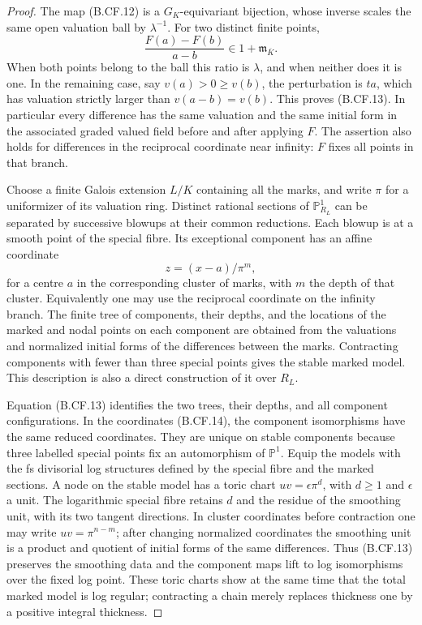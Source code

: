 \begin{proof}
The map (B.CF.12) is a \(G_K\)-equivariant bijection, whose inverse
scales the same open valuation ball by \(\lambda^{-1}\).
For two distinct finite points,
\[
          \frac{F(a)-F(b)}{a-b}\in1+\mathfrak m_{\overline K}.
                                                        \tag{B.CF.13}
\]
When both points belong to the ball this ratio is \(\lambda\), and
when neither does it is one. In the remaining case, say
\(v(a)>0\geq v(b)\), the perturbation is \(ta\), which has
valuation strictly larger than \(v(a-b)=v(b)\). This proves
(B.CF.13). In particular every difference has the same valuation and
the same initial form in the associated graded valued field before
and after applying \(F\). The assertion also holds for differences
in the reciprocal coordinate near infinity: \(F\) fixes all points
in that branch.

Choose a finite Galois extension \(L/K\) containing all the marks,
and write \(\pi\) for a uniformizer of its valuation ring. Distinct
rational sections of \(\mathbb P^1_{R_L}\) can be separated by
successive blowups at their common reductions. Each blowup is at a
smooth point of the special fibre. Its exceptional component has an
affine coordinate
\[
                          z=(x-a)/\pi^m,                 \tag{B.CF.14}
\]
for a centre \(a\) in the corresponding cluster of marks, with
\(m\) the depth of that cluster. Equivalently one may use the
reciprocal coordinate on the infinity branch. The finite tree of
components, their depths, and the locations of the marked and nodal
points on each component are obtained from the valuations and
normalized initial forms of the differences between the marks.
Contracting components with fewer than three special points gives
the stable marked model. This description is also a direct
construction of it over \(R_L\).

Equation (B.CF.13) identifies the two trees, their depths, and all
component configurations. In the coordinates (B.CF.14), the
component isomorphisms have the same reduced coordinates. They are
unique on stable components because three labelled special points
fix an automorphism of \(\mathbb P^1\). Equip the models with the
fs divisorial log structures defined by the special fibre and the
marked sections. A node on the stable model has a toric chart
\(uv=\epsilon\pi^d\), with \(d\geq1\) and \(\epsilon\) a
unit. The logarithmic special fibre retains \(d\) and the residue
of the smoothing unit, with its two tangent directions. In cluster
coordinates before contraction one may write
\(uv=\pi^{n-m}\); after changing normalized coordinates the
smoothing unit is a product and quotient of initial forms of the
same differences. Thus (B.CF.13) preserves the smoothing data and
the component maps lift to log isomorphisms over the fixed log point.
These toric charts show at the same time that the total marked model
is log regular; contracting a chain merely replaces thickness one
by a positive integral thickness.


\end{proof}
